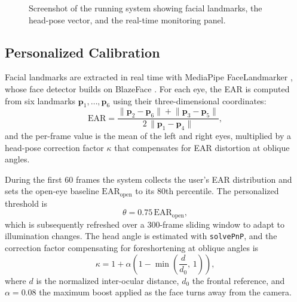 \documentclass{IEEE_lsens}
\begin{document}
\begin{figure}[!t]
\centering
{}
\caption{Screenshot of the running system showing facial landmarks, the
head-pose vector, and the real-time monitoring panel.}
\label{fig_screen}
\end{figure}
\subsection{Personalized Calibration}
Facial landmarks are extracted in real time with MediaPipe FaceLandmarker
\cite{lugaresi2019}, whose face detector builds on BlazeFace
\cite{bazarevsky2019}. For each eye, the EAR is computed from six landmarks
$\bm{p}_1,\dots,\bm{p}_6$ using their three-dimensional coordinates:
\begin{equation}
\mathrm{EAR}=\frac{\lVert \bm{p}_2-\bm{p}_6\rVert+\lVert \bm{p}_3-\bm{p}_5\rVert}
{2\,\lVert \bm{p}_1-\bm{p}_4\rVert},
\label{eq_ear}
\end{equation}
and the per-frame value is the mean of the left and right eyes, multiplied
by a head-pose correction factor $\kappa$ that compensates for EAR
distortion at oblique angles.

During the first 60 frames the system collects the user's EAR distribution
and sets the open-eye baseline $\mathrm{EAR}_{\text{open}}$ to its 80th
percentile. The personalized threshold is
\begin{equation}
\theta = 0.75\,\mathrm{EAR}_{\text{open}},
\label{eq_thresh}
\end{equation}
which is subsequently refreshed over a 300-frame sliding window to adapt to
illumination changes. The head angle is estimated with \texttt{solvePnP}, and
the correction factor compensating for foreshortening at oblique angles is
\begin{equation}
\kappa = 1 + \alpha\left(1 - \min\!\left(\frac{d}{d_0},\,1\right)\right),
\label{eq_kappa}
\end{equation}
where $d$ is the normalized inter-ocular distance, $d_0$ the frontal
reference, and $\alpha=0.08$ the maximum boost applied as the face turns away
from the camera.
\end{document}
